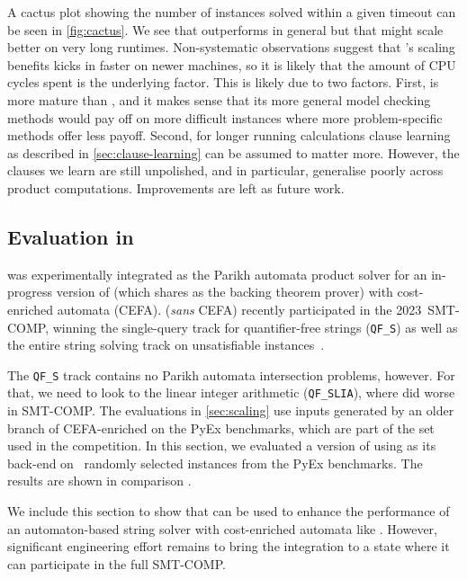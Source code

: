 A cactus plot showing the number of instances solved within a given timeout can
be seen in \cref{fig:cactus}. We see that \Calculus{} outperforms \Nuxmv{} in
general but that \Nuxmv{} might scale better on very long runtimes.
Non-systematic observations suggest that \Nuxmv{}'s scaling benefits kicks in
faster on newer machines, so it is likely that the amount of CPU cycles spent is
the underlying factor. This is likely due to two factors. First, \Nuxmv{} is
more mature than \Calculus{}, and it makes sense that its more general model
checking methods would pay off on more difficult instances where more
problem-specific methods offer less payoff. Second, for longer running
calculations clause learning as described in \cref{sec:clause-learning} can be
assumed to matter more. However, the clauses we learn are still unpolished, and
in particular, generalise poorly across product computations. Improvements are
left as future work.

\subsection{Evaluation in \Ostrich{}}\label{}%
\Catra{} was experimentally integrated as the Parikh automata product solver for
an in-progress version of \Ostrich{} (which shares \Princess{} as the backing
theorem prover) with cost-enriched automata (CEFA). \Ostrich{} (\textit{sans}
CEFA) recently participated in the 2023~SMT-COMP, winning the single-query track
for quantifier-free strings (\texttt{QF\_S}) as well as the entire string
solving track on unsatisfiable instances~\cite{smt-comp-23}.

The \texttt{QF\_S} track contains no Parikh automata intersection problems,
however. For that, we need to look to the linear integer arithmetic
(\texttt{QF\_SLIA}), where \Ostrich{} did worse in SMT-COMP. The evaluations in
\cref{sec:scaling} use inputs generated by an older branch of CEFA-enriched
\Ostrich{} on the PyEx benchmarks, which are part of the set used in the
competition. In this section, we evaluated a version of \Ostrich{} using
\Catra{} as its back-end 
on ~randomly selected instances from the PyEx benchmarks. The
results are shown in comparison .

We include this section to show that \Calculus{} can be used to enhance the
performance of an automaton-based string solver with cost-enriched automata like
\Ostrich{}. However, significant engineering effort remains to bring the
integration to a state where it can participate in the full SMT-COMP.

